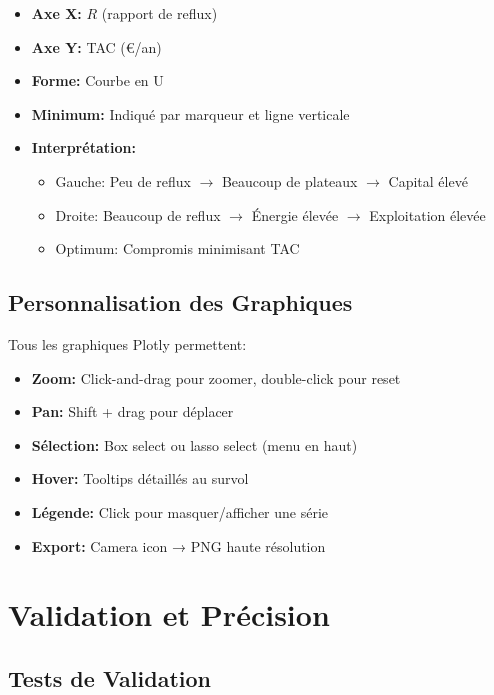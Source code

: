 \documentclass[11pt,a4paper]{article}
\begin{document}
\begin{itemize}[leftmargin=*]
    \item \textbf{Axe X:} $R$ (rapport de reflux)
    \item \textbf{Axe Y:} TAC (€/an)
    \item \textbf{Forme:} Courbe en U
    \item \textbf{Minimum:} Indiqué par marqueur et ligne verticale
    \item \textbf{Interprétation:}
    \begin{itemize}
        \item Gauche: Peu de reflux $\rightarrow$ Beaucoup de plateaux $\rightarrow$ Capital élevé
        \item Droite: Beaucoup de reflux $\rightarrow$ Énergie élevée $\rightarrow$ Exploitation élevée
        \item Optimum: Compromis minimisant TAC
    \end{itemize}
\end{itemize}

\subsection{Personnalisation des Graphiques}

Tous les graphiques Plotly permettent:

\begin{itemize}[leftmargin=*]
    \item \textbf{Zoom:} Click-and-drag pour zoomer, double-click pour reset
    \item \textbf{Pan:} Shift + drag pour déplacer
    \item \textbf{Sélection:} Box select ou lasso select (menu en haut)
    \item \textbf{Hover:} Tooltips détaillés au survol
    \item \textbf{Légende:} Click pour masquer/afficher une série
    \item \textbf{Export:} Camera icon → PNG haute résolution
\end{itemize}

\section{Validation et Précision}

\subsection{Tests de Validation}
\end{document}

